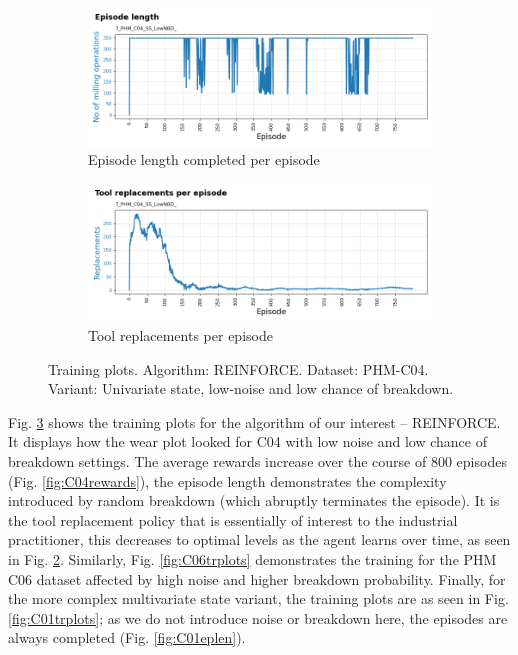 \documentclass[a4paper, 12pt]{article}
\begin{document}
\begin{figure}[ht]
	\begin{subfigure}[b]{0.5\textwidth}
		\centering
		\includegraphics[width=\textwidth]{images/TrainingPlots/7_PHM_C04_SS_LowNBD__Episode_Length.png}  
		\caption{Episode length completed per episode}
		\label{fig:C04eplen}
	\end{subfigure}
	\hfill
	\begin{subfigure}[b]{0.5\textwidth}
		\centering
		\includegraphics[width=\textwidth]{images/TrainingPlots/7_PHM_C04_SS_LowNBD__Tool_Replacements.png}  
		\caption{Tool replacements per episode}
		\label{fig:C04toolrep}
	\end{subfigure} 
	\caption{Training plots. Algorithm: REINFORCE. Dataset: PHM-C04. Variant: Univariate state, low-noise and low chance of breakdown.}
	\label{fig:C04trplots}
\end{figure}
Fig. \ref{fig:C04trplots} shows the training plots for the algorithm of our interest -- REINFORCE. It displays how the wear plot looked for C04 with low noise and low chance of breakdown settings. The average rewards increase over the course of 800 episodes (Fig. \ref{fig:C04rewards}), the episode length demonstrates the complexity introduced by random breakdown (which abruptly terminates the episode). It is the tool replacement policy that is essentially of interest to the industrial practitioner, this decreases to optimal levels as the agent learns over time, as seen in Fig. \ref{fig:C04toolrep}. Similarly, Fig. \ref{fig:C06trplots} demonstrates the training for the PHM C06 dataset affected by high noise and higher breakdown probability. Finally, for the more complex multivariate state variant, the training plots are as seen in Fig. \ref{fig:C01trplots}; as we do not introduce noise or breakdown here, the episodes are always completed (Fig. \ref{fig:C01eplen}).
\end{document}

